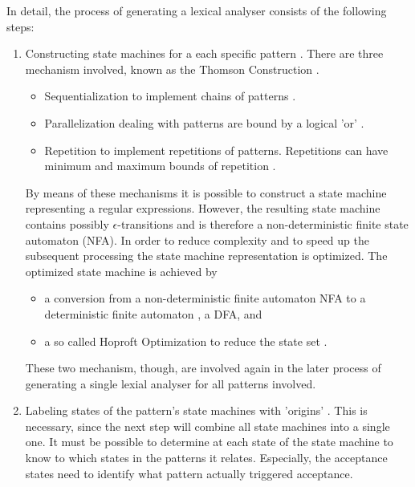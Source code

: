 In detail, the process of generating a lexical analyser consists of the
following steps:

\begin{enumerate}

\item Constructing state machines for a each specific pattern
      . There are three mechanism
      involved, known as the Thomson Construction \cite{}.
      
    \begin{itemize} 
       \item Sequentialization to implement chains of patterns 
             . 
       \item Parallelization dealing with patterns are bound by a logical 'or' 
             . 
       \item Repetition to implement repetitions of patterns. Repetitions can have minimum
       	     and maximum bounds of repetition 
	     . 
    \end{itemize}	     
   
    By means of these mechanisms it is possible to construct a state machine representing 
    a regular expressions. However, the resulting state machine contains possibly
    $\epsilon$-transitions and is therefore a non-deterministic finite state
    automaton (NFA). In order to reduce complexity and to speed up the subsequent 
    processing the state machine representation is optimized. The optimized state machine
    is achieved by 
    
    \begin{itemize}
       \item a conversion from a non-deterministic finite automaton NFA to a 
             deterministic finite automaton , a DFA, and
       \item  a so called Hoproft Optimization \cite{} to reduce the state set 
              .
    \end{itemize}

    These two mechanism, though, are involved again in the later process of generating 
    a single lexial analyser for all patterns involved.

\item Labeling states of the pattern's state machines with 'origins' . 
      This is necessary,
      since the next step will combine all state machines into a single one. 
      It must be possible to determine at each state of the state machine to know to which
      states in the patterns it relates. Especially, the acceptance states need to 
      identify what pattern actually triggered acceptance. 


\end{enumerate}
